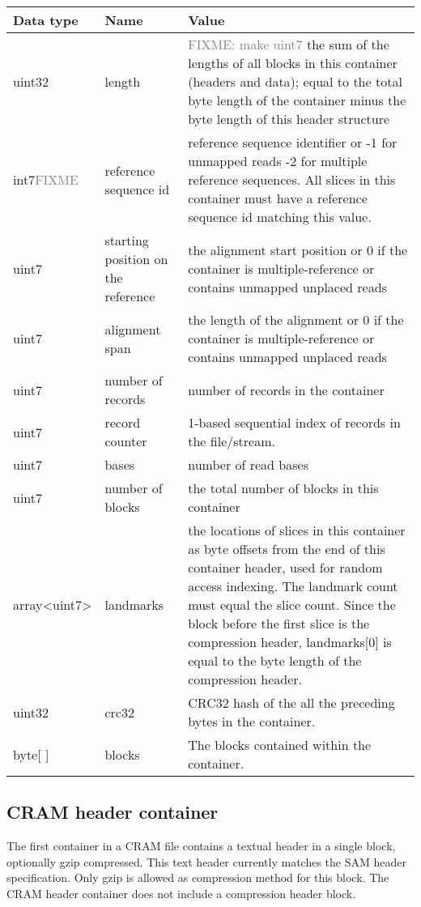 \documentclass[a4paper]{article}
\begin{document}
\begin{tabular}{|l|>{\raggedright}p{120pt}|>{\raggedright}p{260pt}|}
\hline
\textbf{Data type} & \textbf{Name} & \textbf{Value}
\tabularnewline
\hline
uint32 & length & \textcolor{gray}{FIXME: make uint7} the sum of the lengths of all blocks in this container (headers and data); 
equal to the total byte length of the container minus the byte length of this header structure\tabularnewline
\hline
int7\textcolor{gray}{FIXME} & reference sequence id & reference sequence identifier  or\linebreak{}
-1 for unmapped reads\linebreak{}
-2 for multiple reference sequences.\linebreak{}
All slices in this container must have a reference sequence id matching this value.\tabularnewline
\hline
uint7 & starting position on the reference & the alignment start position or\linebreak{}
0 if the container is multiple-reference
or contains unmapped unplaced reads\tabularnewline
\hline
uint7 & alignment span & the length of the alignment or\linebreak{}
0 if the container is multiple-reference
or contains unmapped unplaced reads\tabularnewline
\hline
uint7 & number of records & number of records in the container\tabularnewline
\hline
uint7 & record counter & 1-based sequential index of records in the file/stream.\tabularnewline
\hline
uint7 & bases & number of read bases\tabularnewline
\hline
uint7 & number of blocks & the total number of blocks in this container\tabularnewline
\hline
array<uint7> & landmarks & the locations of slices in this container as byte offsets from the end of 
this container header, used for random access indexing.
The landmark count must equal the slice count.\linebreak{}
Since the block before the first slice is the compression header,
landmarks[0] is equal to the byte length of the compression header.\tabularnewline
\hline
uint32 & crc32 & CRC32 hash of the all the preceding bytes in the container.\tabularnewline
\hline
byte[ ] & blocks & The blocks contained within the container.\tabularnewline
\hline
\end{tabular}

\subsection{\textbf{CRAM header container}}

The first container in a CRAM file contains a textual header in a single block, optionally
gzip compressed. This text header currently matches the SAM header specification. Only
gzip is allowed as compression method for this block. The CRAM header container does not
include a compression header block.
\end{document}
